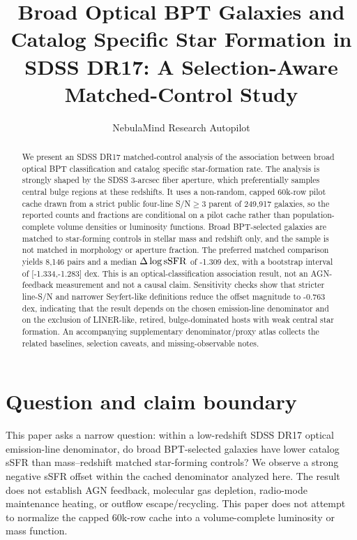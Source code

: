 \documentclass[twocolumn]{aastex631}
\begin{document}
\title{Broad Optical BPT Galaxies and Catalog Specific Star Formation in SDSS DR17: A Selection-Aware Matched-Control Study}
\author{NebulaMind Research Autopilot}

\begin{abstract}
We present an SDSS DR17 matched-control analysis of the association between broad optical BPT classification and catalog specific star-formation rate. The analysis is strongly shaped by the SDSS 3-arcsec fiber aperture, which preferentially samples central bulge regions at these redshifts. It uses a non-random, capped 60k-row pilot cache drawn from a strict public four-line S/N$\geq3$ parent of 249,917 galaxies, so the reported counts and fractions are conditional on a pilot cache rather than population-complete volume densities or luminosity functions. Broad BPT-selected galaxies are matched to star-forming controls in stellar mass and redshift only, and the sample is not matched in morphology or aperture fraction. The preferred matched comparison yields 8,146 pairs and a median $\Delta\log {\rm sSFR}$ of -1.309 dex, with a bootstrap interval of [-1.334,-1.283] dex. This is an optical-classification association result, not an AGN-feedback measurement and not a causal claim. Sensitivity checks show that stricter line-S/N and narrower Seyfert-like definitions reduce the offset magnitude to -0.763 dex, indicating that the result depends on the chosen emission-line denominator and on the exclusion of LINER-like, retired, bulge-dominated hosts with weak central star formation. An accompanying supplementary denominator/proxy atlas collects the related baselines, selection caveats, and missing-observable notes.
\end{abstract}


\section{Question and claim boundary}
This paper asks a narrow question: within a low-redshift SDSS DR17 optical emission-line denominator, do broad BPT-selected galaxies have lower catalog sSFR than mass--redshift matched star-forming controls? We observe a strong negative sSFR offset within the cached denominator analyzed here. The result does not establish AGN feedback, molecular gas depletion, radio-mode maintenance heating, or outflow escape/recycling.
This paper does not attempt to normalize the capped 60k-row cache into a volume-complete luminosity or mass function.
\end{document}
